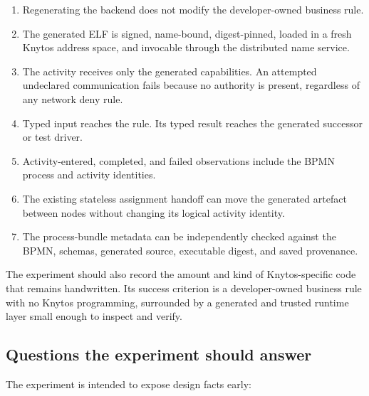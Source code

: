 \begin{enumerate}
    \item Regenerating the backend does not modify the developer-owned business
        rule.

    \item The generated ELF is signed, name-bound, digest-pinned, loaded in a
        fresh Knytos address space, and invocable through the distributed
        name service.

    \item The activity receives only the generated capabilities. An attempted
        undeclared communication fails because no authority is present, regardless
        of any network deny rule.

    \item Typed input reaches the rule. Its typed result reaches the generated
        successor or test driver.

    \item Activity-entered, completed, and failed observations include the BPMN
        process and activity identities.

    \item The existing stateless assignment handoff can move the generated
        artefact between nodes without changing its logical activity identity.

    \item The process-bundle metadata can be independently checked against the
        BPMN, schemas, generated source, executable digest, and saved
        provenance.
\end{enumerate}

The experiment should also record the amount and kind of Knytos-specific
code that remains handwritten. Its success criterion is a developer-owned
business rule with no Knytos programming, surrounded by a generated and
trusted runtime layer small enough to inspect and verify.

\subsection{Questions the experiment should answer}

The experiment is intended to expose design facts early:

